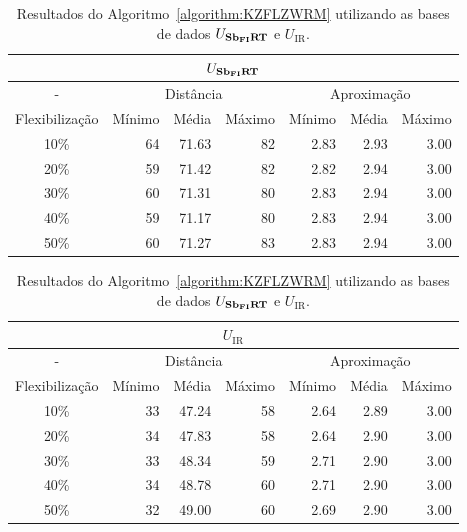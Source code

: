 \begin{table}[!htb]
  \caption{Resultados do Algoritmo~\ref{algorithm:KZFLZWRM} utilizando as bases de dados $U_{\textbf{Sb\textsubscript{FI}RT}}{}$ e $U_{\text{IR}}$.}
  \label{table:DRUHLZFM}
  \centering
  \begin{tabular}{|c|r|r|r|r|r|r|}
    \hline
    \multicolumn{7}{|c|}{$U_{\textbf{Sb\textsubscript{FI}RT}}{}$}                                                                      \\ \hline
      -            & \multicolumn{3}{c|}{Distância}             & \multicolumn{3}{c|}{Aproximação}           \\ \hline
    Flexibilização & Mínimo       & Média        & Máximo       & Mínimo       & Média        & Máximo       \\ \hline  
    10\%           & 64           & 71.63        & 82           & 2.83         & 2.93         & 3.00         \\ \hline
    20\%           & 59           & 71.42        & 82           & 2.82         & 2.94         & 3.00         \\ \hline
    30\%           & 60           & 71.31        & 80           & 2.83         & 2.94         & 3.00         \\ \hline
    40\%           & 59           & 71.17        & 80           & 2.83         & 2.94         & 3.00         \\ \hline
    50\%           & 60           & 71.27        & 83           & 2.83         & 2.94         & 3.00         \\ \hline    
  \end{tabular}

  \vspace{5mm}

  \begin{tabular}{|c|r|r|r|r|r|r|}
    \hline
    \multicolumn{7}{|c|}{$U_{\text{IR}}$}                                                                    \\ \hline
      -            & \multicolumn{3}{c|}{Distância}             & \multicolumn{3}{c|}{Aproximação}           \\ \hline
    Flexibilização & Mínimo       & Média        & Máximo       & Mínimo       & Média        & Máximo       \\ \hline  
    10\%           & 33           & 47.24        & 58           & 2.64         & 2.89         & 3.00         \\ \hline
    20\%           & 34           & 47.83        & 58           & 2.64         & 2.90         & 3.00         \\ \hline
    30\%           & 33           & 48.34        & 59           & 2.71         & 2.90         & 3.00         \\ \hline
    40\%           & 34           & 48.78        & 60           & 2.71         & 2.90         & 3.00         \\ \hline
    50\%           & 32           & 49.00        & 60           & 2.69         & 2.90         & 3.00         \\ \hline    
  \end{tabular}
\end{table}


